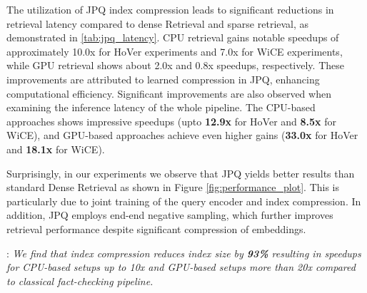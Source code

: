 The utilization of JPQ index compression leads to significant reductions in retrieval latency compared to dense Retrieval and sparse retrieval, as demonstrated in \autoref{tab:jpq_latency}. CPU retrieval gains notable speedups of approximately 10.0x for HoVer experiments and 7.0x for WiCE experiments, while GPU retrieval shows about 2.0x and 0.8x speedups, respectively. These improvements are attributed to learned compression in JPQ, enhancing computational efficiency. 
Significant improvements are also observed when examining the inference latency of the whole pipeline. The CPU-based approaches shows impressive speedups (upto \textbf{12.9x} for HoVer and \textbf{8.5x} for WiCE), and GPU-based approaches achieve even higher gains (\textbf{33.0x} for HoVer and \textbf{18.1x} for WiCE). 

Surprisingly, in our experiments we observe that JPQ yields better results than standard Dense Retrieval as shown in Figure \ref{fig:performance_plot}. This is particularly due to joint training of the query encoder and index compression. In addition, JPQ employs end-end negative sampling, which further improves retrieval performance despite significant compression of embeddings.

: \textit{We find that index compression reduces index size by \textbf{93\%} resulting in speedups for CPU-based setups up to 10x and GPU-based setups more than 20x compared to classical fact-checking pipeline.}

